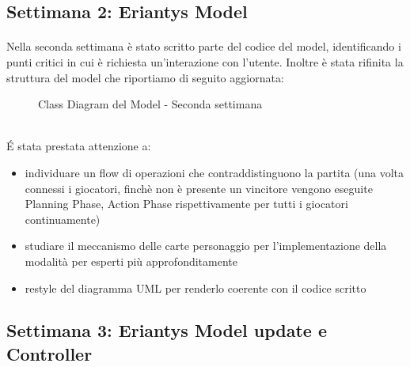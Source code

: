 \documentclass[a4paper, 12pt]{article}
\begin{document}
	\subsection{Settimana 2: Eriantys Model}
	\paragraph{}
	Nella seconda settimana è stato scritto parte del codice del model, identificando i punti critici in cui è richiesta un'interazione con l'utente. Inoltre è stata rifinita la struttura del model che riportiamo di seguito aggiornata:\\
	\begin{figure}[h]
		\centering
		\def\svgwidth{\columnwidth}
		\resizebox{\linewidth}{!}{}
		\caption{Class Diagram del Model - Seconda settimana}
	\end{figure}\\
	É stata prestata attenzione a:
		\begin{itemize}
		\setlength{\parskip}{0pt}
		\setlength{\parsep}{0pt}
		
		\item individuare un flow di operazioni che contraddistinguono la partita (una volta connessi i giocatori, finchè non è presente un vincitore vengono eseguite Planning Phase, Action Phase rispettivamente per tutti i giocatori continuamente)
		\item studiare il meccanismo delle carte personaggio per l'implementazione della modalità per esperti più approfonditamente
		\item restyle del diagramma UML per renderlo coerente con il codice scritto
	\end{itemize}

	\newpage
	\subsection{Settimana 3: Eriantys Model update e Controller}
\end{document}
